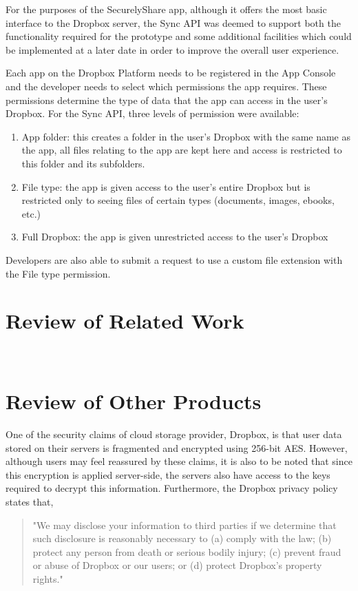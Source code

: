 For the purposes of the SecurelyShare app, although it offers the most basic interface to the Dropbox server, the Sync API was deemed to support both the functionality required for the prototype and some additional facilities which could be implemented at a later date in order to improve the overall user experience.

Each app on the Dropbox Platform needs to be registered in the App Console and the developer needs to select which permissions the app requires. These permissions determine the type of data that the app can access in the user's Dropbox.  For the Sync API, three levels of permission were available:
\begin{enumerate}
\item App folder:  this creates a folder in the user's Dropbox with the same name as the app, all files relating to the app are kept here and access is restricted to this folder and its subfolders.
\item File type: the app is given access to the user's entire Dropbox but is restricted only to seeing files of certain types (documents, images, ebooks, etc.)  
\item Full Dropbox:  the app is given unrestricted access to the user's Dropbox
\end{enumerate}
Developers are also able to submit a request to use a custom file extension with the File type permission.


\section{Review of Related Work }
\label{sec:agke}
\\

\section{Review of Other Products}

One of the security claims of cloud storage provider, Dropbox, is that user data stored on their servers is  fragmented and encrypted using 256-bit AES.  However, although users may feel reassured by these claims, it is also to be noted that since this encryption is applied server-side, the servers also have access to the keys required to decrypt this information.  Furthermore, the   Dropbox privacy policy states that,  
\begin{quotation}
"We may disclose your information to third parties if we determine that such disclosure is reasonably necessary to (a) comply with the law; (b) protect any person from death or serious bodily injury; (c) prevent fraud or abuse of Dropbox or our users; or (d) protect Dropbox's property rights." 
\end{quotation} 


